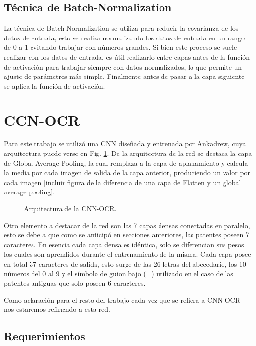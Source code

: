 \subsection{Técnica de Batch-Normalization}

La técnica de Batch-Normalization se utiliza para reducir la covarianza de los datos de entrada, esto se realiza normalizando los datos de entrada en un rango de 0 a 1 evitando trabajar con números grandes. Si bien este proceso se suele realizar con los datos de entrada, es útil realizarlo entre capas antes de la función de activación para trabajar siempre con datos normalizados, lo que permite un ajuste de parámetros más simple. Finalmente antes de pasar a la capa siguiente se aplica la función de activación.

\section{CCN-OCR}

Para este trabajo se utilizó una CNN diseñada y entrenada por Ankadrew, cuya arquitectura puede verse en Fig. \ref{fig:arquitectura-cnn-ocr}. De la arquitectura de la red se destaca la capa de Global Average Pooling, la cual remplaza a la capa de aplanamiento y calcula la media por cada imagen de salida de la capa anterior, produciendo un valor por cada imagen [incluir figura de la diferencia de una capa de Flatten y un global average pooling].
\begin{figure}
    \centering
    \caption{Arquitectura de la CNN-OCR.}
    \label{fig:arquitectura-cnn-ocr}
\end{figure}

Otro elemento a destacar de la red son las 7 capas densas conectadas en paralelo, esto se debe a que como se anticipó en secciones anteriores, las patentes poseen 7 caracteres. En esencia cada capa densa es idéntica, solo se diferencian sus pesos los cuales son aprendidos durante el entrenamiento de la misma. Cada capa posee en total 37 caracteres de salida, esto surge de las 26 letras del abecedario, los 10 números del 0 al 9 y el símbolo de guion bajo (\_) utilizado en el caso de las patentes antiguas que solo poseen 6 caracteres.

Como aclaración para el resto del trabajo cada vez que se refiera a CNN-OCR nos estaremos refiriendo a esta red.

\subsection{Requerimientos}

